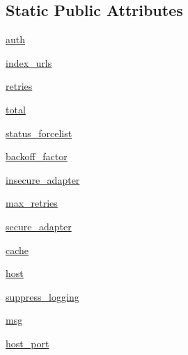 \subsection*{Static Public Attributes}
\begin{DoxyCompactItemize}
\item 
\hyperlink{classpip_1_1__internal_1_1network_1_1session_1_1PipSession_a928c7de9a84a62e9eb9d1cd7d02860ed}{auth}
\item 
\hyperlink{classpip_1_1__internal_1_1network_1_1session_1_1PipSession_a53aab44f26d095c56436056c2042df6e}{index\+\_\+urls}
\item 
\hyperlink{classpip_1_1__internal_1_1network_1_1session_1_1PipSession_a2382bd518000fca846ab8848538b84c9}{retries}
\item 
\hyperlink{classpip_1_1__internal_1_1network_1_1session_1_1PipSession_a68ca6b648126f2ca6e30075b6dfdd5bb}{total}
\item 
\hyperlink{classpip_1_1__internal_1_1network_1_1session_1_1PipSession_a81f1ac7c5b5b05d6b91ed19257f12adb}{status\+\_\+forcelist}
\item 
\hyperlink{classpip_1_1__internal_1_1network_1_1session_1_1PipSession_ac3c940ca1dd2be8ac78948a29c549078}{backoff\+\_\+factor}
\item 
\hyperlink{classpip_1_1__internal_1_1network_1_1session_1_1PipSession_ab1acddf4888e233369d1a5e6d7084e9e}{insecure\+\_\+adapter}
\item 
\hyperlink{classpip_1_1__internal_1_1network_1_1session_1_1PipSession_a0941f19c7d0af3d2882237cd4a7a33c8}{max\+\_\+retries}
\item 
\hyperlink{classpip_1_1__internal_1_1network_1_1session_1_1PipSession_a262875fe1ec88e208f3343fb0fc51b7c}{secure\+\_\+adapter}
\item 
\hyperlink{classpip_1_1__internal_1_1network_1_1session_1_1PipSession_a45f99e8730df177cf433c3b0d0d5248d}{cache}
\item 
\hyperlink{classpip_1_1__internal_1_1network_1_1session_1_1PipSession_aebe7f4852da0627f2f57e55203dc00ed}{host}
\item 
\hyperlink{classpip_1_1__internal_1_1network_1_1session_1_1PipSession_add8c45a843cf65c278bd1af7c9a6046d}{suppress\+\_\+logging}
\item 
\hyperlink{classpip_1_1__internal_1_1network_1_1session_1_1PipSession_ae3b72a5814ff9d1911df3f49ba8f0fe0}{msg}
\item 
\hyperlink{classpip_1_1__internal_1_1network_1_1session_1_1PipSession_a8b6d8644fe1e36d8ade1a9a093368bb8}{host\+\_\+port}
\end{DoxyCompactItemize}


